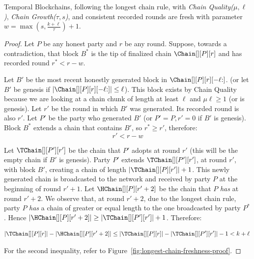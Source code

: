 \begin{theorem}\label{thm.longest-chain-freshness}
  Temporal Blockchains, following the longest chain rule,
  with \emph{Chain Quality($\mu,\ell$)},
  \emph{Chain Growth($\tau, s$)},
  and consistent recorded rounds
  are fresh with parameter $w =\max(s, \frac{k + \ell}{\tau}) + 1$.
\end{theorem}
\begin{proof}
  Let $P$ be any honest party and $r$ be any round.
  Suppose, towards a contradiction, that block $B^*$
  is the tip of finalized chain $\Chain[][P][r]$ and has
  recorded round $r^* < r - w$.

  Let $B'$ be the most recent honestly generated block
  in $\Chain[][P][r][{-\ell}{:}]$.
  (or let $B'$ be genesis if $|\Chain[][P][r][{-\ell}{:}]| \leq \ell$).
  This block exists by
  Chain Quality because we are looking at a chain chunk of length at least $\ell$ and
  $\mu\ell \geq 1$ (or is genesis).
  Let $r'$ be the round in which $B'$ was generated.
  Its recorded round is also $r'$.
  Let $P'$ be the party who generated $B'$
  (or $P' = P, r' = 0$ if $B'$ is genesis).
  Block $B^*$ extends a chain that contains $B'$, so $r^* \geq r'$,
  therefore:
  \begin{equation}
    r' < r - w \label{eq:bitcoin-r-bound}
  \end{equation}

  Let $\TChain[][P'][r']$ be the chain that $P'$ adopts at
  round $r'$ (this will be the empty chain if $B'$ is genesis).
  Party $P'$ extends $\TChain[][P'][r']$, at round $r'$, with block $B'$,
  creating a chain of length $|\TChain[][P][r']| + 1$.
  This newly generated chain is broadcasted to the network and
  received by party $P$ at the beginning of round $r' + 1$.
  Let $\HChain[][P][r' + 2]$ be the chain
  that $P$ \emph{has} at round $r' + 2$.
  We observe that, at round $r' + 2$, due to the
  longest chain rule, party $P$ \emph{has} a chain of greater or equal
  length to the one broadcasted by party $P^*$. Hence
  $|\HChain[][P][r' + 2]| \geq |\TChain[][P'][r']| + 1$. Therefore:

  \begin{equation}
    |\TChain[][P][r]| - |\HChain[][P][r' + 2]| \leq
     |\TChain[][P][r]| - |\TChain[][P'][r']| - 1 <
     k + \ell\, \label{eq:bitcoin-contradiction}
  \end{equation}

  For the second inequality, refer to Figure~\ref{fig:longest-chain-freshness-proof}.


\end{proof}
